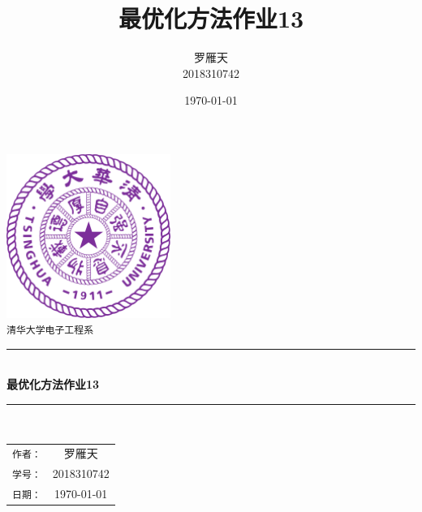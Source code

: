 \documentclass[a4paper,12pt]{article}
\title{最优化方法作业13}
\author{罗雁天 \\
2018310742}
\date{\today}
\begin{document}
\newcommand{\HRule}{\rule{\linewidth}{0.5mm}}
\begin{titlepage}
	\begin{center}
		\includegraphics[width=0.4\textwidth]{Tsinghua2.png}\\[1cm]
		\textsc{\Large \texttt{清华大学电子工程系}}\\[1cm]
		\HRule \\[1cm]
		{\Huge \bfseries 最优化方法作业13}\\[0.4cm]
		\HRule \\[3.5cm]
		\begin{minipage}{0.4\textwidth}
			\begin{center}
				\Large
				\begin{tabular}{cc}
					\texttt{作者：} & 罗雁天 \\[0.5cm]
					\texttt{学号：} & 2018310742 \\[0.5cm]
					\texttt{日期：} & \today
				\end{tabular}
			\end{center}
		\end{minipage}
		\vfill
	\end{center}
\end{titlepage}
\end{document}

